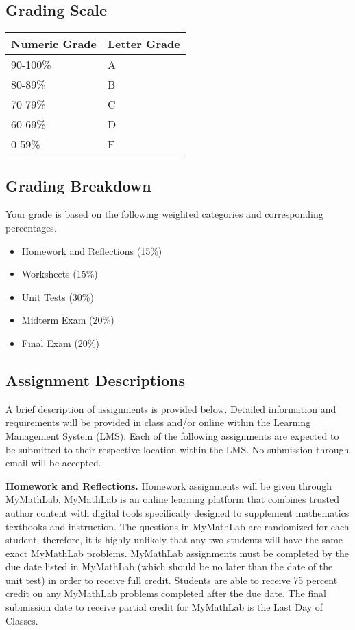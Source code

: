 \documentclass[11pt]{article}
\begin{document}
\subsection{Grading Scale}

\bigskip\noindent
\begin{tabular}{p{}p{}}
\toprule
Numeric Grade & Letter Grade \\
\hline
90-100\% & A \\
80-89\% & B \\
70-79\% & C \\
60-69\% & D \\
0-59\% & F \\
\bottomrule
\end{tabular}

\bigskip\subsection{Grading Breakdown}

Your grade is based on the following weighted categories and corresponding percentages.

\begin{itemize}
\item Homework and Reflections (15\%)
\item Worksheets (15\%)
\item Unit Tests (30\%)
\item Midterm Exam (20\%)
\item Final Exam (20\%)
\end{itemize}

\subsection{Assignment Descriptions}

A brief description of assignments is provided below. Detailed information and requirements will be provided in class and/or online within the Learning Management System (LMS). Each of the following assignments are expected to be submitted to their respective location within the LMS. No submission through email will be accepted.

\textbf{Homework and Reflections.} Homework assignments will be given through MyMathLab. MyMathLab is an online learning platform that combines trusted author content with digital tools specifically designed to supplement mathematics textbooks and instruction. The questions in MyMathLab are randomized for each student; therefore, it is highly unlikely that any two students will have the same exact MyMathLab problems. MyMathLab assignments must be completed by the due date listed in MyMathLab (which should be no later than the date of the unit test) in order to receive full credit. Students are able to receive 75 percent credit on any MyMathLab problems completed after the due date. The final submission date to receive partial credit for MyMathLab is the Last Day of Classes.
\end{document}
